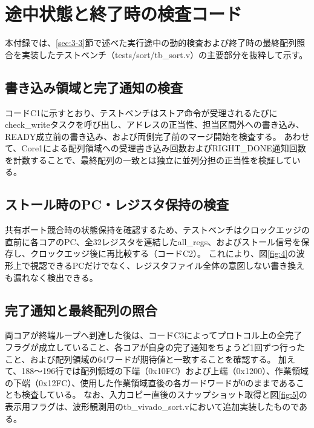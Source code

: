 \chapter{途中状態と終了時の検査コード}\label{chap:C}

本付録では、\ref{sec:3-3}節で述べた実行途中の動的検査および終了時の最終配列照合を実装したテストベンチ（tests/sort/tb\_sort.v）の主要部分を抜粋して示す。

\section{書き込み領域と完了通知の検査}\label{sec:C-1}

コードC1に示すとおり、テストベンチはストア命令が受理されるたびにcheck\_writeタスクを呼び出し、アドレスの正当性、担当区間外への書き込み、READY成立前の書き込み、および両側完了前のマージ開始を検査する。
あわせて、Core1による配列領域への受理書き込み回数およびRIGHT\_DONE通知回数を計数することで、最終配列の一致とは独立に並列分担の正当性を検証している。

\par\medskip{}\par\nopagebreak


\clearpage
\section{ストール時のPC・レジスタ保持の検査}\label{sec:C-2}

共有ポート競合時の状態保持を確認するため、テストベンチはクロックエッジの直前に各コアのPC、全32レジスタを連結したall\_regs、およびストール信号を保存し、クロックエッジ後に再比較する（コードC2）。
これにより、図\ref{fig:4}の波形上で視認できるPCだけでなく、レジスタファイル全体の意図しない書き換えも漏れなく検出できる。

\par\medskip{}\par\nopagebreak


\section{完了通知と最終配列の照合}\label{sec:C-3}

両コアが終端ループへ到達した後は、コードC3によってプロトコル上の全完了フラグが成立していること、各コアが自身の完了通知をちょうど1回ずつ行ったこと、および配列領域の64ワードが期待値と一致することを確認する。
加えて、188〜196行では配列領域の下端（0x10FC）および上端（0x1200）、作業領域の下端（0x12FC）、使用した作業領域直後の各ガードワードが0のままであることも検査している。
なお、入力コピー直後のスナップショット取得と図\ref{fig:5}の表示用フラグは、波形観測用のtb\_vivado\_sort.vにおいて追加実装したものである。

\par\medskip{}\par\nopagebreak

